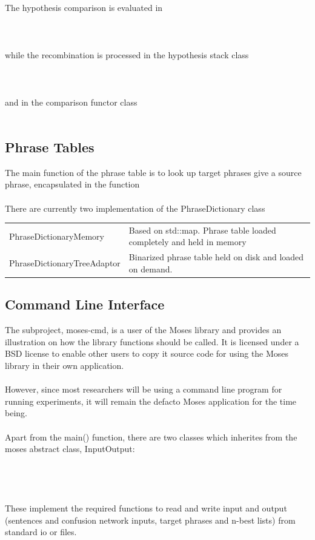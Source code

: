 \documentclass[11pt]{book}
\theoremstyle{plain}
\begin{document}
\\
The hypothesis comparison is evaluated in \\
\\
\\
\\
while the recombination is processed in the hypothesis stack class\\
\\
\\
\\
and in the comparison functor class\\
\\
\subsection{Phrase Tables}	
The main function of the phrase table is to look up target phrases give a source phrase, encapsulated in the function\\
\\
There are currently two implementation of the PhraseDictionary class\\
\begin{tabular}{|l|l|}
\hline
PhraseDictionaryMemory & Based on std::map. Phrase table loaded completely and held in memory\\
PhraseDictionaryTreeAdaptor & Binarized phrase table held on disk and loaded on demand.\\
\hline
\end{tabular}
\subsection{Command Line Interface}
The subproject, moses-cmd, is a user of the Moses library and provides an illustration on how the library functions should be called. It is licensed under a BSD license to enable other users to copy it source code for using the Moses library in their own application.\\
\\
However, since most researchers will be using a command line program for running experiments, it will remain the defacto Moses application for the time being.\\
\\
Apart from the main() function, there are two classes which inherites from the moses abstract class, InputOutput:\\
\\
\\
\\
\\
These implement the required functions to read and write input and output (sentences and confusion network inputs, target phrases and n-best lists) from standard io or files.\\
\end{document}
